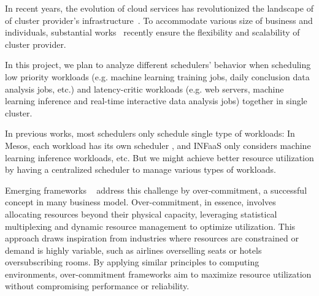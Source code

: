 
In recent years, the evolution of cloud services has revolutionized the landscape of of cluster provider's infrastructure~\cite{noauthor_trends_2023}. To accommodate various size of business and individuals, substantial works~\cite{volcano}\cite{hindman2011mesos}\cite{ghodsi_dominant_nodate}\cite{narayanan_heterogeneity-aware_2020}\cite{romero2021infaas} recently ensure the flexibility and scalability of cluster provider.  

In this project, we plan to analyze different schedulers' behavior when scheduling low priority workloads (e.g. machine learning training jobs, daily conclusion data analysis jobs, etc.)  and latency-critic workloads (e.g. web servers, machine learning inference and real-time interactive data analysis jobs) together in single cluster.

In previous works, most schedulers only schedule single type of workloads:
In Mesos, each workload has its own scheduler \cite{hindman2011mesos}, and INFaaS \cite{romero2021infaas} only considers machine learning inference workloads, etc. But we might achieve better resource utilization by having a centralized scheduler to manage various types of workloads. 


Emerging frameworks ~\cite{koo}\cite{:aa}\cite{:kube-batch} address this challenge by over-commitment, a successful concept in many business model. Over-commitment, in essence, involves allocating resources beyond their physical capacity, leveraging statistical multiplexing and dynamic resource management to optimize utilization. This approach draws inspiration from industries where resources are constrained or demand is highly variable, such as airlines overselling seats or hotels oversubscribing rooms. By applying similar principles to computing environments, over-commitment frameworks aim to maximize resource utilization without compromising performance or reliability.

